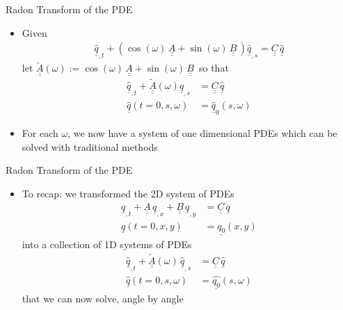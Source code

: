 \documentclass{beamer}
\newcommand{\bunderline}[1]{\underline{#1}}
\renewcommand{\vec}[1]{{\bunderline{#1}}}
\newcommand{\mat}[1]{{\bunderline{\bunderline{#1}}}}
\begin{document}
\begin{frame}{Radon Transform of the PDE}
	\begin{itemize}
		\item Given 
		\begin{align*}
			\vec{\widehat{q}}_{,t} + \left( \cos (\omega) \, \mat{A} + \sin (\omega) \, \mat{B} \, \right)\vec{\widehat{q}}_{,s} = \mat{C}\,\vec{\widehat{q}}
		\end{align*}
		let $\widetilde{\mat{A}}(\omega) :=  \cos (\omega) \, \mat{A} + \sin (\omega) \, \mat{B}\,$ so that
		\begin{align*}
		\vec{\widehat{q}}_{,t} + \widetilde{\mat{A}}(\omega) \vec{\widehat{q}}_{,s} & = \mat{C}\,\vec{\widehat{q}} \\
		\widehat{\vec{q}}(t = 0, s, \omega) & = \widehat{\vec{q}}_{0}(s, \omega)
		\end{align*}
		\item For each $\omega$, we now have a system of one dimensional PDEs which can be solved with traditional methods
	\end{itemize}
\end{frame}

\begin{frame}{Radon Transform of the PDE}
    \begin{itemize}
        \item To recap: we transformed the 2D system of PDEs
        \begin{align*}
            \vec{q}_{, t} + \mat{A} \, \vec{q}_{, x} + \mat{B} \, \vec{q}_{, y} & = \mat{C} \, \vec{q} \\
                                                                  \vec{q}(t = 0, x, y) & = \vec{q_{0}}(x, y)
        \end{align*}
        into a collection of 1D systems of PDEs
        \begin{align*}
            \widehat{\vec{q}}_{,t} + \widetilde{\mat{A}} (\omega) \, \widehat{\vec{q}}_{,s} & = \mat{C} \, \widehat{\vec{q}} \\
                                                        \widehat{\vec{q}}(t = 0, s, \omega) & = \widehat{\vec{q_{0}}}(s, \omega)
        \end{align*}
        that we can now solve, angle by angle
    \end{itemize}

\end{frame}
\end{document}
